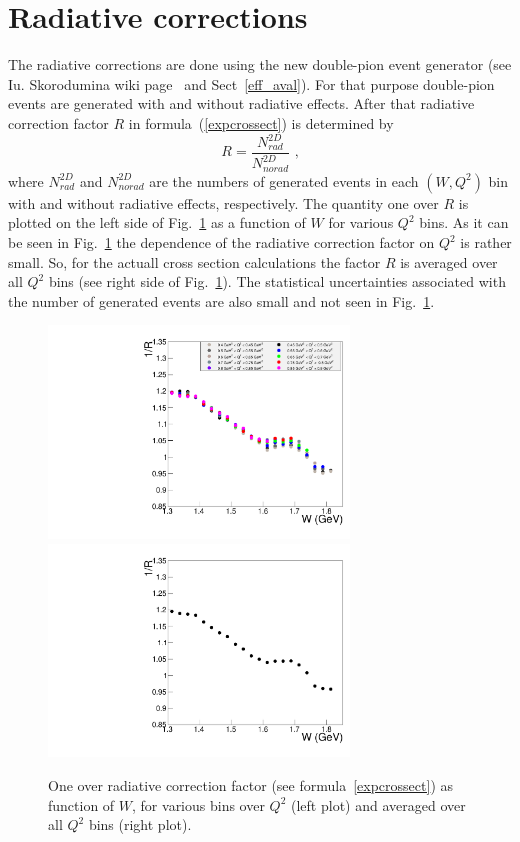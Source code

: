 \section{Radiative corrections}
\label{radiative}

The radiative corrections are done using the new double-pion event generator (see Iu. Skorodumina wiki page~\cite{Skorodum:EG} and Sect~\ref{eff_aval}). For that purpose double-pion events are generated with and without radiative effects.  After that radiative
correction factor $R$ in formula~(\ref{expcrossect})
is determined by
\begin{equation}
\label{radcorrfact}
R = \frac{N_{rad}^{2D}}{N_{norad}^{2D}} \textrm{ ,}
\end{equation}
where $N_{rad}^{2D}$ and $N_{norad}^{2D}$ are
the numbers of generated events in each $(W, Q^{2})$ bin
with and without radiative effects, respectively.
The quantity one over $R$ is plotted on the left side of Fig.~\ref{radcorrfact} as a function of $W$ for various $Q^{2}$ bins. As it can be seen in Fig.~\ref{radcorrfact} the dependence of the radiative correction factor on $Q^{2}$ is rather small. So, for the actuall cross section calculations the factor $R$ is averaged over all $Q^{2}$ bins (see right side of Fig.~\ref{radcorrfact}). The statistical uncertainties associated with the number of generated events are also small and not seen in Fig.~\ref{radcorrfact}.

\begin{figure}[htp]
\begin{center}
\includegraphics[width=8cm]{pictures/rad_corr/rad_corr_all_q2.pdf}
\includegraphics[width=8cm]{pictures/rad_corr/rad_corr_avrg.pdf}
\caption{\small One over radiative correction factor (see formula~\ref{expcrossect})
as function of $W$, for various bins over $Q^{2}$ (left plot) and averaged over all  $Q^{2}$ bins (right plot).} \label{radcorrfact}
\end{center}
\end{figure}

